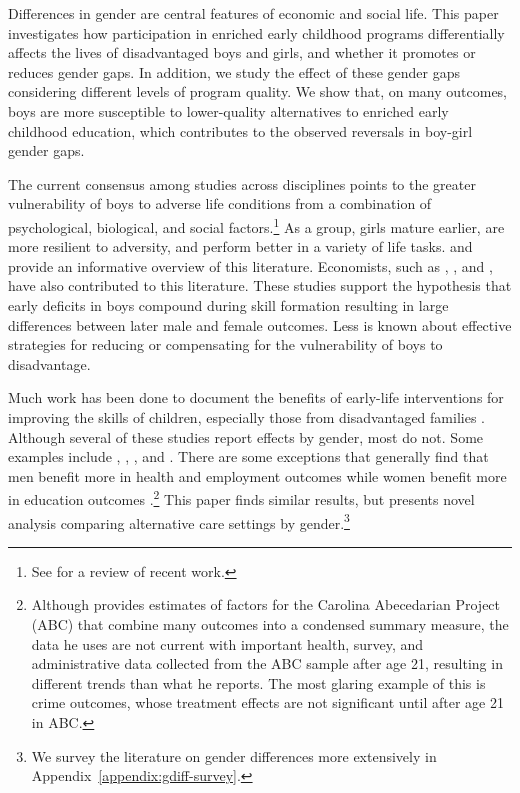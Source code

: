 Differences in gender are central features of economic and social life. This paper investigates how participation in enriched early childhood programs differentially affects the lives of disadvantaged boys and girls, and whether it promotes or reduces gender gaps. In addition, we study the effect of these gender gaps considering different levels of program quality. We show that, on many outcomes, boys are more susceptible to lower-quality alternatives to enriched early childhood education, which contributes to the observed reversals in boy-girl gender gaps. 

The current consensus among studies across disciplines points to the greater vulnerability of boys to adverse life conditions from a combination of psychological, biological, and social factors.\footnote{See \citet{Golding_Fitzgerald_2017_IMHJ} for a review of recent work.} As a group, girls mature earlier, are more resilient to adversity, and perform better in a variety of life tasks. \citet{Eliot_Brain_2009_BOOK} and \citet{Schore_2017_IMHJ} provide an informative overview of this literature. Economists, such as \citet{Bertrand_Pan_2013_AEJAE}, \citet{Kottelenberg_Lehrer_2014_Gender-Effects}, and \citet{Autor-etal_2015_Family-Disadvantage}, have also contributed to this literature. These studies support the hypothesis that early deficits in boys compound during skill formation resulting in large differences between later male and female outcomes. Less is known about effective strategies for reducing or compensating for the vulnerability of boys to disadvantage.

Much work has been done to document the benefits of early-life interventions for improving the skills of children, especially those from disadvantaged families \citep{Currie_2011_AER,Elango_Hojman_etal_2016_Early-Edu}. Although several of these studies report effects by gender, most do not. Some examples include \citet{Bernal_Keane_2011_JoLE}, \citet{Cascio_Schanzenbach_2013_ImpactsExpandingAccess}, \citet{Bitler_et_al_2014_Head_Start_Unpublished}, and \citet{Kline_Walters_2016_QJE}. There are some exceptions that generally find that men benefit more in health and employment outcomes while women benefit more in education outcomes \citep{Anderson_2008_JASA,Heckman_Moon_etal_2010_QE,Campbell_Conti_etal_2014_EarlyChildhoodInvestments,Garcia_Heckman_Leaf_etal_2017_Comp_CBA_Unpublished}.\footnote{Although \citet{Anderson_2008_JASA} provides estimates of factors for the Carolina Abecedarian Project (ABC) that combine many outcomes into a condensed summary measure, the data he uses are not current with important health, survey, and administrative data collected from the ABC sample after age 21, resulting in different trends than what he reports. The most glaring example of this is crime outcomes, whose treatment effects are not significant until after age 21 in ABC.} This paper finds similar results, but presents novel analysis comparing alternative care settings by gender.\footnote{We survey the literature on gender differences more extensively in Appendix~\ref{appendix:gdiff-survey}.} 

